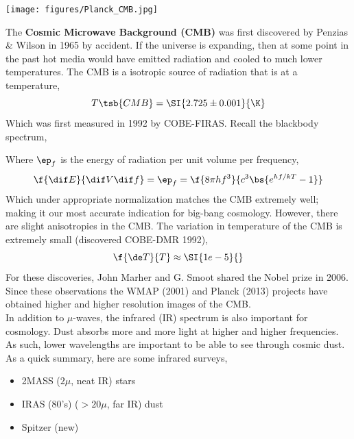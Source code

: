 \documentclass{article}
\begin{document}
\begin{center}
    \texttt{[image: figures/Planck\_CMB.jpg]}
\end{center}

The \textbf{Cosmic Microwave Background (CMB)} was first discovered by Penzias \& Wilson in 1965 by accident. If the universe is expanding, then at some point in the past hot media would have emitted radiation and cooled to much lower temperatures. The CMB is a isotropic source of radiation that is at a temperature,
\[ T\tsb{CMB} = \SI{2.725 \pm 0.001}{\K} \]
Which was first measured in 1992 by COBE-FIRAS. Recall the blackbody spectrum,
\begin{center}
\end{center}

Where $\ep_f$ is the energy of radiation per unit volume per frequency,
\[ \f{\dif E}{ \dif V \dif f} = \ep_f = \f{8\pi h f^3}{c^3\bs{e^{hf/kT} - 1}} \]
Which under appropriate normalization matches the CMB extremely well; making it our most accurate indication for big-bang cosmology. However, there are slight anisotropies in the CMB. The variation in temperature of the CMB is extremely small (discovered COBE-DMR 1992),
\[ \f{\de T}{T} \approx \SI{1e-5}{} \]
For these discoveries, John Marher and G. Smoot shared the Nobel prize in 2006. Since these observations the WMAP (2001) and Planck (2013) projects have obtained higher and higher resolution images of the CMB. \\

In addition to $\mu$-waves, the infrared (IR) spectrum is also important for cosmology. Dust absorbs more and more light at higher and higher frequencies. As such, lower wavelengths are important to be able to see through cosmic dust. As a quick summary, here are some infrared surveys,
\begin{itemize}
    \item 2MASS ($2\mu$, neat IR) stars
    \item IRAS (80's) ($>20\mu$, far IR) dust
    \item Spitzer (new)
\end{itemize}
\end{document}
